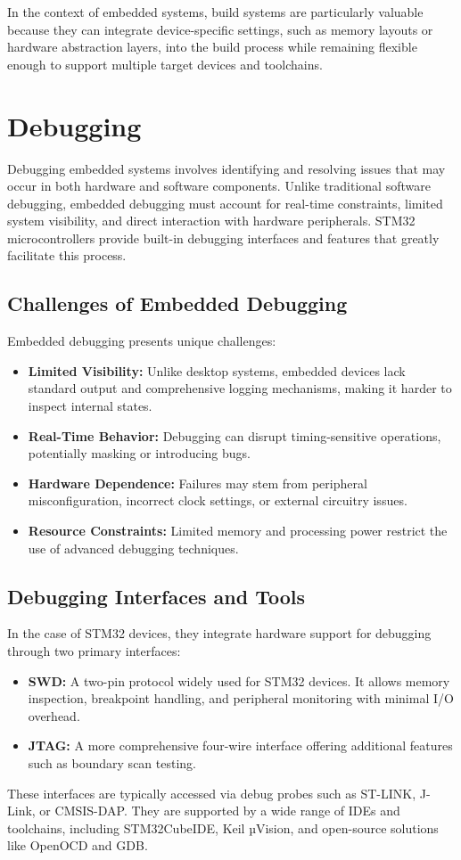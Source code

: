 In the context of embedded systems, build systems are particularly valuable because they can integrate device-specific settings, such as memory layouts or hardware abstraction layers, into the build process while remaining flexible enough to support multiple target devices and toolchains.

\section{Debugging}
Debugging embedded systems involves identifying and resolving issues that may occur in both hardware and software components. Unlike traditional software debugging, embedded debugging must account for real-time constraints, limited system visibility, and direct interaction with hardware peripherals. STM32 microcontrollers provide built-in debugging interfaces and features that greatly facilitate this process.

\subsection{Challenges of Embedded Debugging}
Embedded debugging presents unique challenges:
\begin{itemize}
	\item \textbf{Limited Visibility:} Unlike desktop systems, embedded devices lack standard output and comprehensive logging mechanisms, making it harder to inspect internal states.
	\item \textbf{Real-Time Behavior:} Debugging can disrupt timing-sensitive operations, potentially masking or introducing bugs.
	\item \textbf{Hardware Dependence:} Failures may stem from peripheral misconfiguration, incorrect clock settings, or external circuitry issues.
	\item \textbf{Resource Constraints:} Limited memory and processing power restrict the use of advanced debugging techniques.
\end{itemize}

\subsection{Debugging Interfaces and Tools}
In the case of STM32 devices, they integrate hardware support for debugging through two primary interfaces:
\begin{itemize}
	\item \textbf{SWD:} A two-pin protocol widely used for STM32 devices. It allows memory inspection, breakpoint handling, and peripheral monitoring with minimal I/O overhead.
	\item \textbf{JTAG:} A more comprehensive four-wire interface offering additional features such as boundary scan testing.
\end{itemize}
These interfaces are typically accessed via debug probes such as ST-LINK, J-Link, or CMSIS-DAP. They are supported by a wide range of IDEs and toolchains, including STM32CubeIDE, Keil µVision, and open-source solutions like OpenOCD and GDB.

